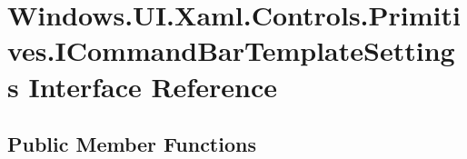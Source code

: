 \hypertarget{interface_windows_1_1_u_i_1_1_xaml_1_1_controls_1_1_primitives_1_1_i_command_bar_template_settings}{}\section{Windows.\+U\+I.\+Xaml.\+Controls.\+Primitives.\+I\+Command\+Bar\+Template\+Settings Interface Reference}
\label{interface_windows_1_1_u_i_1_1_xaml_1_1_controls_1_1_primitives_1_1_i_command_bar_template_settings}
\subsection*{Public Member Functions}
